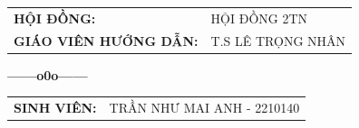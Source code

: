 \begin{titlepage}
\begin{center}
                                                                                                                                                                                                                \vspace{0.2cm}

                                                                                                                                                                                                                    \begin{tabular}{l l}
                                                                                                                                                                                                                            \textbf{HỘI ĐỒNG:} & HỘI ĐỒNG 2TN \\
                                                                                                                                                                                                                                    \textbf{GIÁO VIÊN HƯỚNG DẪN:} & T.S LÊ TRỌNG NHÂN \\

                                                                                                                                                                                                                                               \end{tabular}

                                                                                                                                                                                                                                                       \textbf{------o0o------}


                                                                                                                                                                                                                                                               \begin{tabular}{l l}
                                                                                                                                                                                                                                                                       \textbf{SINH VIÊN:} & TRẦN NHƯ MAI ANH - 2210140 \\


\end{tabular}
\end{center}
\end{titlepage}
